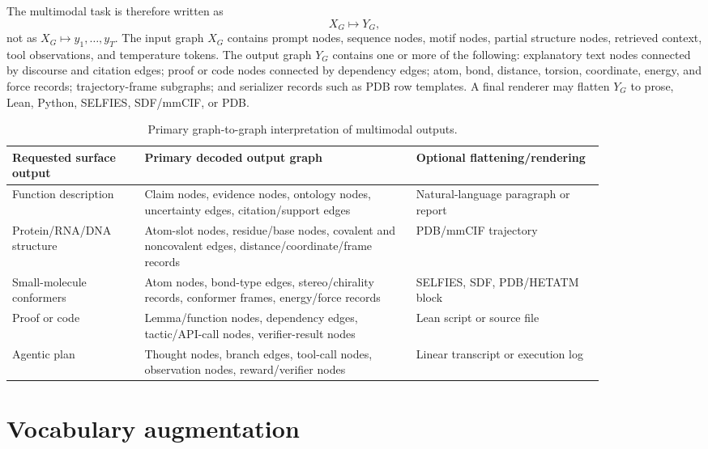 \documentclass[11pt]{article}
\newcommand{\1}{\mathbf{1}}
\begin{document}
The multimodal task is therefore written as
\[
  X_G \longmapsto Y_G,
\]
not as \(X_G\longmapsto y_1,\ldots,y_T\). The input graph \(X_G\) contains prompt nodes, sequence nodes, motif nodes, partial structure nodes, retrieved context, tool observations, and temperature tokens. The output graph \(Y_G\) contains one or more of the following: explanatory text nodes connected by discourse and citation edges; proof or code nodes connected by dependency edges; atom, bond, distance, torsion, coordinate, energy, and force records; trajectory-frame subgraphs; and serializer records such as PDB row templates. A final renderer may flatten \(Y_G\) to prose, Lean, Python, SELFIES, SDF/mmCIF, or PDB.

\begin{table}[H]
\centering
\caption{Primary graph-to-graph interpretation of multimodal outputs.}
\scriptsize
\setlength{\tabcolsep}{3pt}
\begin{tabular}{p{0.19\linewidth}p{0.39\linewidth}p{0.27\linewidth}}
\toprule
Requested surface output & Primary decoded output graph & Optional flattening/rendering \\
\midrule
Function description & Claim nodes, evidence nodes, ontology nodes, uncertainty edges, citation/support edges & Natural-language paragraph or report \\
Protein/RNA/DNA structure & Atom-slot nodes, residue/base nodes, covalent and noncovalent edges, distance/coordinate/frame records & PDB/mmCIF trajectory \\
Small-molecule conformers & Atom nodes, bond-type edges, stereo/chirality records, conformer frames, energy/force records & SELFIES, SDF, PDB/HETATM block \\
Proof or code & Lemma/function nodes, dependency edges, tactic/API-call nodes, verifier-result nodes & Lean script or source file \\
Agentic plan & Thought nodes, branch edges, tool-call nodes, observation nodes, reward/verifier nodes & Linear transcript or execution log \\
\bottomrule
\end{tabular}
\end{table}


\section{Vocabulary augmentation}
\end{document}
